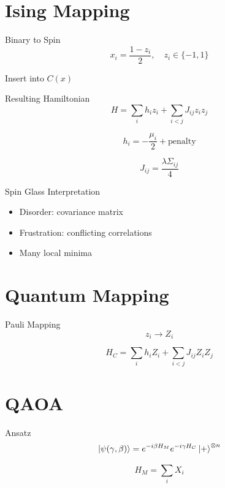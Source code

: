 \documentclass[aspectratio=169]{beamer}
\begin{document}
\section{Ising Mapping}

\begin{frame}{Binary to Spin}
\[
x_i = \frac{1 - z_i}{2}, \quad z_i \in \{-1,1\}
\]

Insert into $C(x)$
\end{frame}

\begin{frame}{Resulting Hamiltonian}
\[
H = \sum_i h_i z_i + \sum_{i<j} J_{ij} z_i z_j
\]

\[
h_i = -\frac{\mu_i}{2} + \text{penalty}
\]

\[
J_{ij} = \frac{\lambda \Sigma_{ij}}{4}
\]
\end{frame}

\begin{frame}{Spin Glass Interpretation}
\begin{itemize}
\item Disorder: covariance matrix
\item Frustration: conflicting correlations
\item Many local minima
\end{itemize}
\end{frame}

\section{Quantum Mapping}

\begin{frame}{Pauli Mapping}
\[
z_i \rightarrow Z_i
\]

\[
H_C = \sum_i h_i Z_i + \sum_{i<j} J_{ij} Z_i Z_j
\]
\end{frame}

\section{QAOA}

\begin{frame}{Ansatz}
\[
\ket{\psi(\gamma,\beta)} = e^{-i\beta H_M} e^{-i\gamma H_C} \ket{+}^{\otimes n}
\]

\[
H_M = \sum_i X_i
\]
\end{frame}
\end{document}
